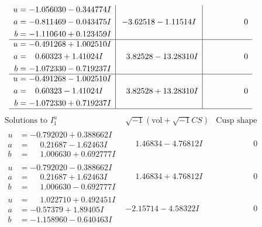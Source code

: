\documentclass[1p]{elsarticle_modified}
\theoremstyle{definition}
\newcommand{\I}{\sqrt{-1}}
\begin{document}
$$\begin{array}{c|c|c}
\begin{aligned}
u &= -1.056030 - 0.344774 I \\
a &= -0.811469 - 0.043475 I \\
b &= -1.110640 + 0.123459 I\end{aligned}
 & -3.62518 - 1.11514 I & \phantom{-0.000000 } 0 \\ \hline\begin{aligned}
u &= -0.491268 + 1.002510 I \\
a &= \phantom{-}0.60323 + 1.41024 I \\
b &= -1.072330 - 0.719237 I\end{aligned}
 & \phantom{-}3.82528 - 13.28310 I & \phantom{-0.000000 } 0 \\ \hline\begin{aligned}
u &= -0.491268 - 1.002510 I \\
a &= \phantom{-}0.60323 - 1.41024 I \\
b &= -1.072330 + 0.719237 I\end{aligned}
 & \phantom{-}3.82528 + 13.28310 I & \phantom{-0.000000 } 0\\
 \hline 
 \end{array}$$\newpage$$\begin{array}{c|c|c}  
\text{Solutions to }I^u_{1}& \I (\text{vol} + \sqrt{-1}CS) & \text{Cusp shape}\\
 \hline 
\begin{aligned}
u &= -0.792020 + 0.388662 I \\
a &= \phantom{-}0.21687 - 1.62463 I \\
b &= \phantom{-}1.006630 + 0.692777 I\end{aligned}
 & \phantom{-}1.46834 - 4.76812 I & \phantom{-0.000000 } 0 \\ \hline\begin{aligned}
u &= -0.792020 - 0.388662 I \\
a &= \phantom{-}0.21687 + 1.62463 I \\
b &= \phantom{-}1.006630 - 0.692777 I\end{aligned}
 & \phantom{-}1.46834 + 4.76812 I & \phantom{-0.000000 } 0 \\ \hline\begin{aligned}
u &= \phantom{-}1.022710 + 0.492451 I \\
a &= -0.57379 + 1.89405 I \\
b &= -1.158960 - 0.640463 I\end{aligned}
 & -2.15714 - 4.58322 I & \phantom{-0.000000 } 0 \\ \hline\begin{aligned}

\end{aligned}
\end{array}$$
\end{document}
